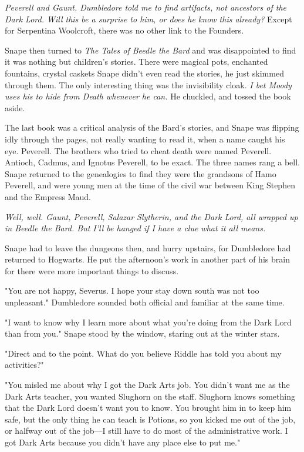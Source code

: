\emph{Peverell and Gaunt. Dumbledore told me to find artifacts, not ancestors of the Dark Lord. Will this be a surprise to him, or does he know this already?} Except for Serpentina Woolcroft, there was no other link to the Founders.

Snape then turned to \emph{The Tales of Beedle the Bard} and was disappointed to find it was nothing but children's stories. There were magical pots, enchanted fountains, crystal caskets{\el} Snape didn't even read the stories, he just skimmed through them. The only interesting thing was the invisibility cloak. \emph{I bet Moody uses his to hide from Death whenever he can.} He chuckled, and tossed the book aside.

The last book was a critical analysis of the Bard's stories, and Snape was flipping idly through the pages, not really wanting to read it, when a name caught his eye. Peverell. The brothers who tried to cheat death were named Peverell. Antioch, Cadmus, and Ignotus Peverell, to be exact. The three names rang a bell. Snape returned to the genealogies to find they were the grandsons of Hamo Peverell, and were young men at the time of the civil war between King Stephen and the Empress Maud.

\emph{Well, well. Gaunt, Peverell, Salazar Slytherin, and the Dark Lord, all wrapped up in Beedle the Bard. But I'll be hanged if I have a clue what it all means.}

Snape had to leave the dungeons then, and hurry upstairs, for Dumbledore had returned to Hogwarts. He put the afternoon's work in another part of his brain for there were more important things to discuss.

"You are not happy, Severus. I hope your stay down south was not too unpleasant." Dumbledore sounded both official and familiar at the same time.

"I want to know why I learn more about what you're doing from the Dark Lord than from you." Snape stood by the window, staring out at the winter stars.

"Direct and to the point. What do you believe Riddle has told you about my activities?"

"You misled me about why I got the Dark Arts job. You didn't want me as the Dark Arts teacher, you wanted Slughorn on the staff. Slughorn knows something that the Dark Lord doesn't want you to know. You brought him in to keep him safe, but the only thing he can teach is Potions, so you kicked me out of the job, or halfway out of the job—I still have to do most of the administrative work. I got Dark Arts because you didn't have any place else to put me."


